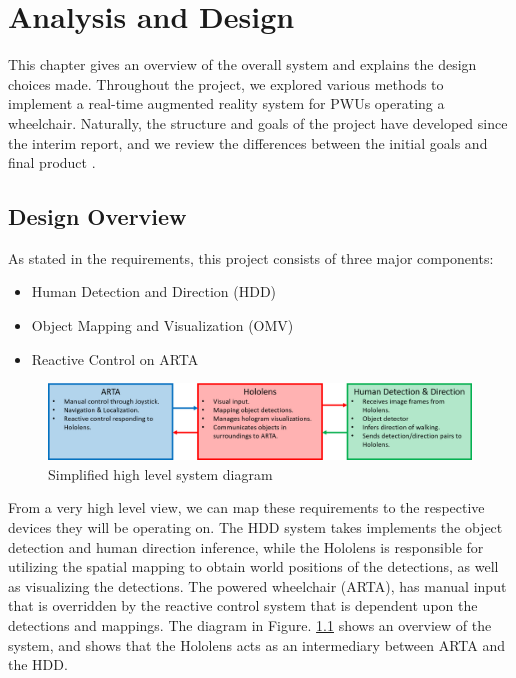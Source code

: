 \chapter{Analysis and Design} \label{chapter:4}
This chapter gives an overview of the overall system and explains the design choices made. Throughout the project, we explored various methods to implement a real-time augmented reality system for PWUs operating a wheelchair. Naturally, the structure and goals of the project have developed since the interim report, and we review the differences between the initial goals and final product .

\section{Design Overview}
As stated in the requirements, this project consists of three major components:
\begin{itemize}
	\item Human Detection and Direction (HDD)
	\item Object Mapping and Visualization (OMV)
	\item Reactive Control on ARTA
\end{itemize}

\begin{figure}[ht]
	\centering
	\includegraphics[width=1.0\linewidth]{img/chapter4_analysis/simpleSystemDiagram.png}
	\caption{Simplified high level system diagram}
	\label{fig:simplifiedHL}
\end{figure}

From a very high level view, we can map these requirements to the respective devices they will be operating on. The HDD system takes implements the object detection and human direction inference, while the Hololens is responsible for utilizing the spatial mapping to obtain world positions of the detections, as well as visualizing the detections. The powered wheelchair (ARTA), has manual input that is overridden by the reactive control system that is dependent upon the detections and mappings. The diagram in Figure. \ref{fig:simplifiedHL} shows an overview of the system, and shows that the Hololens acts as an intermediary between ARTA and the HDD.

